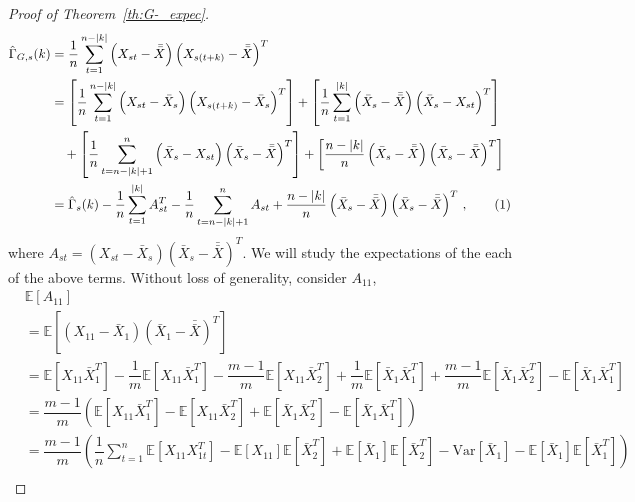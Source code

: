 \documentclass[11pt]{article}
\newcommand{\E}{\mathbb{E}}
\newcommand\numberthis{\addtocounter{equation}{1}\tag{\theequation}}
\theoremstyle{remark}
\begin{document}
\begin{proof}[Proof of Theorem~\ref{th:G-_expec}]
\begin{align*}
\hat{\Gamma}_{G,s}(k) & = \dfrac{1}{n}\sum_{t=1}^{n-|k|} \left(X_{st} - \bar{\bar{X}} \right) \left(X_{s(t+k)} - \bar{\bar{X}} \right)^T \\
    &= \left[\dfrac{1}{n} \sum_{t=1}^{n-|k|} \left(X_{st} - \bar{X}_s \right) \left(X_{s(t+k)} - \bar{X}_s \right)^T \right] + \left[\dfrac{1}{n} \sum_{t=1}^{|k|} \left(\bar{X}_s - \bar{\bar{X}} \right)  \left(\bar{X}_s - X_{st} \right)^T\right] \\ 
    & \quad +  \left[\dfrac{1}{n} \sum_{t=n-|k|+1}^{n}  \left( \bar{X}_s - X_{st} \right)  \left(\bar{X}_s - \bar{\bar{X}} \right)^T\right] + \left[\dfrac{n-|k|}{n} \left(\bar{X}_s - \bar{\bar{X}}\right)   \left(\bar{X}_s - \bar{\bar{X}} \right)^T\right]\\
    &= \hat{\Gamma}_s(k) - \dfrac{1}{n} \sum_{t=1}^{|k|}A_{st}^T - \dfrac{1}{n}\sum_{t=n-|k|+1}^{n}A_{st} + \dfrac{n-|k|}{n}  \left(\bar{X}_s - \bar{\bar{X}} \right)  \left(\bar{X}_s - \bar{\bar{X}} \right)^T\,, \numberthis \label{eq:acf_breakdown}
\end{align*}
%
where $A_{st} = (X_{st}-\bar{X}_s)(\bar{X}_s - \bar{\bar{X}})^T$. We will study the expectations of the each of the above terms. Without loss of generality, consider $A_{11}$,
\begin{align*}
    &\E \left[A_{11} \right]\\
     &= \mathbb{E} \left[ \left(X_{11} - \bar{X}_1 \right) \left(\bar{X}_1 - \bar{\bar{X}} \right)^T \right]\\
    &= \mathbb{E} \left[X_{11}\bar{X}_1^T \right] - \dfrac{1}{m}\mathbb{E} \left[X_{11}\bar{X}_1^T \right] - \dfrac{m-1}{m}\mathbb{E} \left[X_{11}\bar{X}_2^T \right] + \dfrac{1}{m}\mathbb{E} \left[\bar{X}_1\bar{X}_1^T \right] + \dfrac{m-1}{m}\mathbb{E} \left[\bar{X}_1\bar{X}_2^T \right] - \mathbb{E} \left[\bar{X}_1\bar{X}_1^T \right]\\
    &= \dfrac{m-1}{m}\left(\mathbb{E} \left[X_{11}\bar{X}_1^T \right] - \mathbb{E} \left[X_{11}\bar{X}_2^T \right] + \mathbb{E} \left[\bar{X}_1\bar{X}_2^T \right] - \mathbb{E} \left[\bar{X}_1\bar{X}_1^T \right]\right)\\
    &= \dfrac{m-1}{m}\left(\dfrac{1}{n}\sum_{t=1}^{n}\mathbb{E} \left[X_{11}X_{1t}^T \right] - \mathbb{E}\left[X_{11}\right] \mathbb{E}\left[\bar{X}_2^T \right] + \mathbb{E} \left[\bar{X}_1\right]\mathbb{E}\left[\bar{X}_2^T\right] - \text{Var}\left[\bar{X}_1 \right] - \mathbb{E}\left[\bar{X}_1 \right]\mathbb{E}\left[\bar{X}_1^T \right]\right)\\

\end{align*}
\end{proof}
\end{document}
